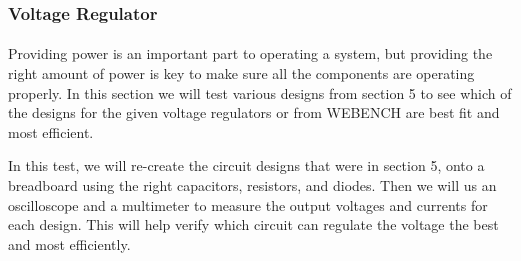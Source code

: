 \subsubsection{Voltage Regulator}
\paragraph{}Providing power is an important part to operating a system, but providing the right amount of power is key to make sure all the components are operating properly. In this section we will test various designs from section 5 to see which of the designs for the given voltage regulators or from WEBENCH are best fit and most efficient. \par 
In this test, we will re-create the circuit designs that were in section 5, onto a breadboard using the right capacitors, resistors, and diodes. Then we will us an oscilloscope and a multimeter to measure the output voltages and currents for each design. This will help verify which circuit can regulate the voltage the best and most efficiently. \par
